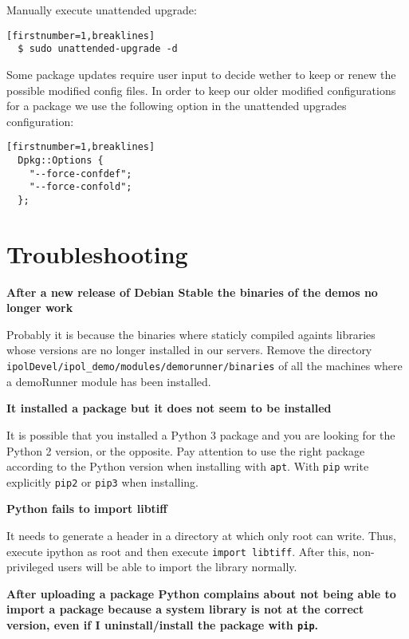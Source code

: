 \documentclass[a4paper,12pt]{article}
\begin{document}
Manually execute unattended upgrade:
\begin{verbatim}[firstnumber=1,breaklines]
  $ sudo unattended-upgrade -d
\end{verbatim}

Some package updates require user input to decide wether to keep or renew the possible modified config files. In order to keep our older modified configurations for a package we use the following option in the unattended upgrades configuration:

\begin{verbatim}[firstnumber=1,breaklines]
  Dpkg::Options {
    "--force-confdef";
    "--force-confold";
  };
\end{verbatim}


\section{Troubleshooting}

\textbf{After a new release of Debian Stable the binaries of the demos no longer work}

Probably it is because the binaries where staticly compiled againts libraries whose versions are no longer installed in our servers. Remove the directory {\tt ipolDevel/ipol\_demo/modules/demorunner/binaries} of all the machines where a demoRunner module has been installed.
\vspace{0.5cm}

\textbf{It installed a package but it does not seem to be installed}

It is possible that you installed a Python 3 package and you are looking for the Python 2 version, or the opposite. Pay attention to use the right package according to the Python version when installing with {\tt apt}. With {\tt pip} write explicitly {\tt pip2} or {\tt pip3} when installing.
\vspace{0.5cm}


\textbf{Python fails to import libtiff}

It needs to generate a header in a directory at which only root can write. Thus, execute ipython as root and then execute {\tt import libtiff}. After this, non-privileged users will be able to import the library normally.
\vspace{0.5cm}

\textbf{After uploading a package Python complains about not being able to import a package because a system library is not at the correct version, even if I uninstall/install the package with {\tt pip}.}
\end{document}
